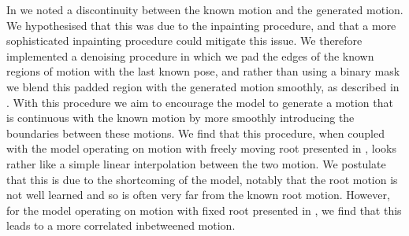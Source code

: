 In  we noted a discontinuity between the known motion and the generated motion. We hypothesised that this was due to the inpainting procedure, and that a more sophisticated inpainting procedure could mitigate this issue. We therefore implemented a denoising procedure in which we pad the edges of the known regions of motion with the last known pose, and rather than using a binary mask we blend this padded region with the generated motion smoothly, as described in . With this procedure we aim to encourage the model to generate a motion that is continuous with the known motion by more smoothly introducing the boundaries between these motions. We find that this procedure, when coupled with the model operating on motion with freely moving root presented in , looks rather like a simple linear interpolation between the two motion. We postulate that this is due to the shortcoming of the model, notably that the root motion is not well learned and so is often very far from the known root motion. However, for the model operating on motion with fixed root presented in , we find that this leads to a more correlated inbetweened motion.